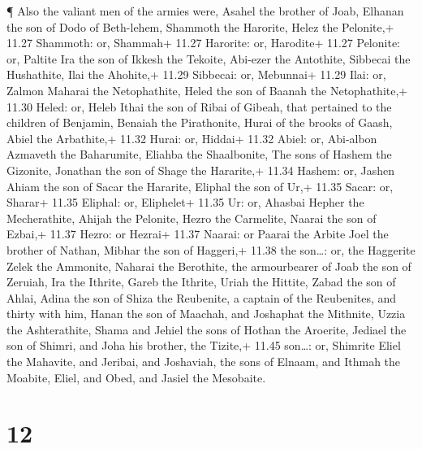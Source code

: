 ¶ Also the valiant men of the armies were, Asahel the
brother of Joab, Elhanan the son of Dodo of Beth-lehem, 
Shammoth the Harorite, Helez the Pelonite,+ 11.27 Shammoth: or, Shammah+
11.27 Harorite: or, Harodite+ 11.27 Pelonite: or, Paltite 
Ira the son of Ikkesh the Tekoite, Abi-ezer the Antothite, 
Sibbecai the Hushathite, Ilai the Ahohite,+ 11.29 Sibbecai: or,
Mebunnai+ 11.29 Ilai: or, Zalmon  Maharai the Netophathite,
Heled the son of Baanah the Netophathite,+ 11.30 Heled: or, Heleb
 Ithai the son of Ribai of Gibeah, that pertained to the
children of Benjamin, Benaiah the Pirathonite,  Hurai of
the brooks of Gaash, Abiel the Arbathite,+ 11.32 Hurai: or, Hiddai+
11.32 Abiel: or, Abi-albon  Azmaveth the Baharumite,
Eliahba the Shaalbonite,  The sons of Hashem the Gizonite,
Jonathan the son of Shage the Hararite,+ 11.34 Hashem: or, Jashen
 Ahiam the son of Sacar the Hararite, Eliphal the son of
Ur,+ 11.35 Sacar: or, Sharar+ 11.35 Eliphal: or, Eliphelet+ 11.35 Ur:
or, Ahasbai  Hepher the Mecherathite, Ahijah the Pelonite,
 Hezro the Carmelite, Naarai the son of Ezbai,+ 11.37
Hezro: or Hezrai+ 11.37 Naarai: or Paarai the Arbite  Joel
the brother of Nathan, Mibhar the son of Haggeri,+ 11.38 the son\ldots:
or, the Haggerite  Zelek the Ammonite, Naharai the
Berothite, the armourbearer of Joab the son of Zeruiah, 
Ira the Ithrite, Gareb the Ithrite,  Uriah the Hittite,
Zabad the son of Ahlai,  Adina the son of Shiza the
Reubenite, a captain of the Reubenites, and thirty with him,
 Hanan the son of Maachah, and Joshaphat the Mithnite,
 Uzzia the Ashterathite, Shama and Jehiel the sons of
Hothan the Aroerite,  Jediael the son of Shimri, and Joha
his brother, the Tizite,+ 11.45 son\ldots: or, Shimrite 
Eliel the Mahavite, and Jeribai, and Joshaviah, the sons of Elnaam, and
Ithmah the Moabite,  Eliel, and Obed, and Jasiel the
Mesobaite.

\hypertarget{section-11}{%
\section{12}\label{section-11}}

